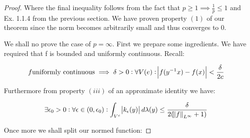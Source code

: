 \begin{proof}
Where the final inequality follows from the fact that $p \geq 1 \implies \frac{1}{p} \leq 1$ and Ex. 1.1.4 from the previous section. We have proven property $(1)$ of our theorem since the norm becomes arbitrarily small and thus converges to 0.

We shall no prove the case of $ p = \infty$. First we prepare some ingredients. We have required that f is bounded and uniformly continuous. Recall:

\begin{align*}
f \text{uniformly continuous} \implies \delta > 0 : \forall  V(e): \abs{f(y^{-1}x)-f(x)} < \frac{\delta}{2c}
\end{align*}

Furthermore from property $(iii)$ of an approximate identity we have:

\begin{align*}
\exists \epsilon_0 > 0 : \forall \epsilon \in (0,\epsilon_0): \int_{V^c} \abs{k_\epsilon(y)} d\lambda(y) \leq \frac{\delta}{2(\norm{f}_{L^\infty}+1)}
\end{align*}

Once more we shall split our normed function:


\end{proof}
